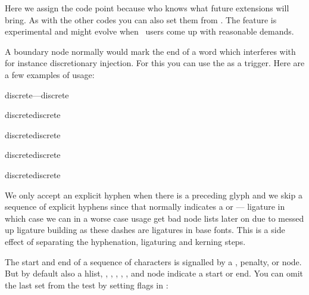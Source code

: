 \typebuffer

Here we assign the code point because who knows what future extensions will
bring. As with the other codes you can also set them from \LUA. The feature is
experimental and might evolve when \CONTEXT\ users come up with reasonable
demands.

\startpacked \getbuffer \stoppacked

A boundary node normally would mark the end of a word which interferes with for
instance discretionary injection. For this you can use the \type {\wordboundary}
as a trigger. Here are a few examples of usage:

\startbuffer
discrete---discrete
\stopbuffer
\typebuffer \startnarrower \dontcomplain \hsize 1pt \getbuffer \par \stopnarrower
\startbuffer
discrete\discretionary{}{}{---}discrete
\stopbuffer
\typebuffer \startnarrower \dontcomplain \hsize 1pt \getbuffer \par \stopnarrower
\startbuffer
discrete\wordboundary\discretionary{}{}{---}discrete
\stopbuffer
\typebuffer \startnarrower \dontcomplain \hsize 1pt \getbuffer \par \stopnarrower
\startbuffer
discrete\wordboundary\discretionary{}{}{---}\wordboundary discrete
\stopbuffer
\typebuffer \startnarrower \dontcomplain \hsize 1pt \getbuffer \par \stopnarrower
\startbuffer
discrete\wordboundary\discretionary{---}{}{}\wordboundary discrete
\stopbuffer
\typebuffer \startnarrower \dontcomplain \hsize 1pt \getbuffer \par \stopnarrower

We only accept an explicit hyphen when there is a preceding glyph and we skip a
sequence of explicit hyphens since that normally indicates a \type {--} or \type
{---} ligature in which case we can in a worse case usage get bad node lists
later on due to messed up ligature building as these dashes are ligatures in base
fonts. This is a side effect of separating the hyphenation, ligaturing and
kerning steps.

The start and end of a sequence of characters is signalled by a , \type
{penalty},  or  node. But by default also a \type
{hlist}, , , , , , and
 node indicate a start or end. You can omit the last set from the
test by setting flags in \type {\hyphenationmode}:

\starttworows
{}
\stoptworows

